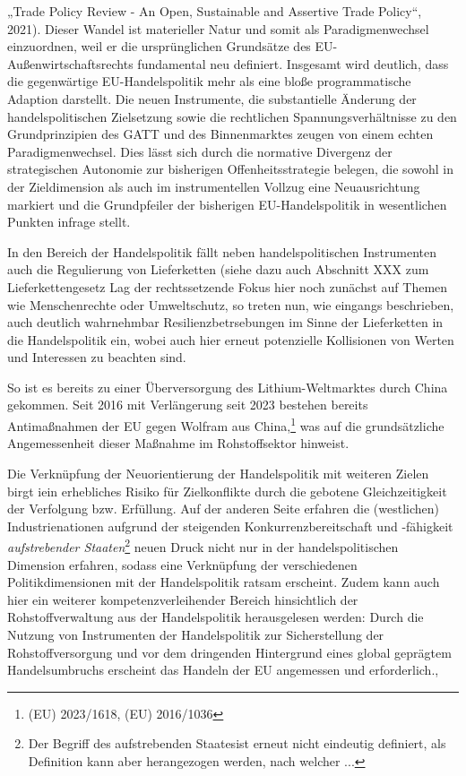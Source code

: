 \documentclass[12pt,a4paper,oneside]{book} %
\begin{document}
„Trade Policy Review - An Open, Sustainable and Assertive Trade Policy“, 2021). Dieser Wandel ist materieller Natur und somit als Paradigmenwechsel einzuordnen, weil er die ursprünglichen Grundsätze des EU-Außenwirtschaftsrechts fundamental neu definiert. Insgesamt wird deutlich, dass die gegenwärtige EU-Handelspolitik mehr als eine bloße programmatische Adaption darstellt. Die neuen Instrumente, die substantielle Änderung der handelspolitischen Zielsetzung sowie die rechtlichen Spannungsverhältnisse zu den Grundprinzipien des GATT und des Binnenmarktes zeugen von einem echten Paradigmenwechsel. Dies lässt sich durch die normative Divergenz der strategischen Autonomie zur bisherigen Offenheitsstrategie belegen, die sowohl in der Zieldimension als auch im instrumentellen Vollzug eine Neuausrichtung markiert und die Grundpfeiler der bisherigen EU-Handelspolitik in wesentlichen Punkten infrage stellt.
	
In den Bereich der Handelspolitik fällt neben handelspolitischen Instrumenten auch die Regulierung von Lieferketten (siehe dazu auch Abschnitt XXX zum Lieferkettengesetz %
Lag der rechtssetzende Fokus hier noch zunächst auf Themen wie Menschenrechte oder Umweltschutz, so treten nun, wie eingangs beschrieben, auch deutlich wahrnehmbar Resilienzbetrsebungen im Sinne der Lieferketten in die Handelspolitik ein, wobei auch hier erneut potenzielle Kollisionen von Werten und Interessen zu beachten sind.\autocite{Müller-Ibold/Herrmann, EuZW 2022, 1085, 1090} 
	
So ist es bereits zu einer Überversorgung des Lithium-Weltmarktes durch China gekommen.\autocite{https://www.reuters.com/markets/commodities/china-is-oversupplying-lithium-eliminate-rivals-us-official-says-2024-10-08/}
Seit 2016 mit Verlängerung seit 2023 bestehen bereits Antimaßnahmen der EU gegen Wolfram aus China,\footnote{ (EU) 2023/1618, (EU) 2016/1036} was auf die grundsätzliche Angemessenheit dieser Maßnahme im Rohstoffsektor hinweist.

Die Verknüpfung der Neuorientierung der Handelspolitik mit weiteren Zielen birgt iein erhebliches Risiko für Zielkonflikte durch die gebotene Gleichzeitigkeit der Verfolgung bzw. Erfüllung.\autocite{Schäffer/Hach, ZRP 2023, 207, 208} Auf der anderen Seite erfahren die (westlichen) Industrienationen aufgrund der steigenden Konkurrenzbereitschaft und -fähigkeit \textit{aufstrebender Staaten}\footnote{Der Begriff des \glqq aufstrebenden Staates\grqq ist erneut nicht eindeutig definiert, als Definition kann aber \cite{CITATIONNEEDED} herangezogen werden, nach welcher ...} neuen Druck nicht nur in der handelspolitischen Dimension erfahren\autocite{Altemöller, EuZW 2019, 321, 322}, sodass eine Verknüpfung der verschiedenen Politikdimensionen mit der Handelspolitik ratsam erscheint. Zudem kann auch hier ein weiterer kompetenzverleihender Bereich hinsichtlich der Rohstoffverwaltung aus der Handelspolitik herausgelesen werden: Durch die Nutzung von Instrumenten der Handelspolitik zur Sicherstellung der Rohstoffversorgung und vor dem dringenden Hintergrund eines global geprägtem Handelsumbruchs erscheint das Handeln der EU angemessen und erforderlich.,
	
\end{document}
